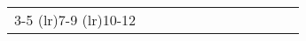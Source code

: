 \begin{longtable}{llcccccccccc}
\cmidrule(lr){3-5} \cmidrule(lr){7-9} \cmidrule(lr){10-12}  
                                                                                                                                                                                                                                                                                                                                                                                                                                                                                                                                                                                                                                                                                                                                                                                                                                                                                        

\end{longtable}
